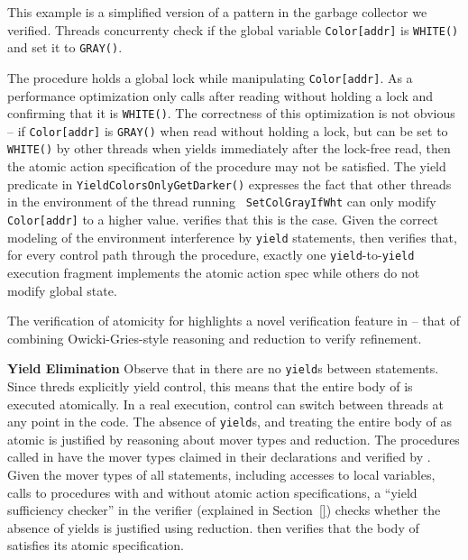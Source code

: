 This example is a simplified version of a pattern in the garbage
collector we verified. Threads concurrenty check 
if the global variable {\tt Color[addr]} is {\tt WHITE()}
and set it to {\tt GRAY()}. 

The procedure   holds a global lock while
manipulating {\tt Color[addr]}. 
As a performance optimization  only calls 
 after reading  without holding a lock
and confirming that it is {\tt WHITE()}. The correctness of this
optimization is not obvious -- if {\tt Color[addr]} is {\tt GRAY()} when
read without holding a lock, but can be set to {\tt WHITE()} by other 
threads when  yields immediately after the
lock-free read, then the atomic action
specification of the procedure may not be satisfied. The yield
predicate in {\tt YieldColorsOnlyGetDarker()} expresses the fact that
other threads in the environment of the thread running {\tt
  SetColGrayIfWht} can only modify {\tt Color[addr]} to a higher
value. \civl verifies that this is the case. Given the correct
modeling of the environment interference by {\tt yield} statements,
\civl then verifies that, for every control path through the
procedure, exactly one {\tt yield}-to-{\tt yield} execution
fragment implements the atomic action spec while others do not modify
global state. 

The verification of atomicity for  highlights a
novel verification feature in \civl -- that of combining
Owicki-Gries-style reasoning and reduction to verify refinement.

{\bf Yield Elimination} Observe that in 
 there are no {\tt yield}s between
statements. Since threds explicitly yield control, this means that the
entire body of  is executed atomically. In
a real execution, control can switch between threads at any point in
the code. The absence of {\tt yield}s, and treating the entire body of
 as atomic is justified by reasoning about
mover types and reduction. The procedures called in
 have the mover types claimed in their
declarations and verified by \civl. Given the mover types of all
statements, including accesses to local variables, calls to procedures
with and without atomic action specifications, a ``yield sufficiency
checker'' in the \civl verifier (explained in Section~\ref{}) checks
whether the absence of yields is justified using reduction.  \civl
then verifies that the body of  satisfies
its atomic specification.

